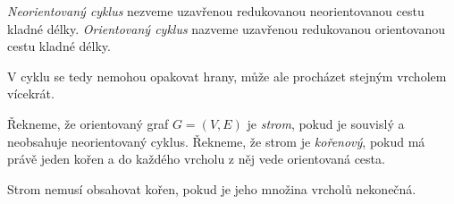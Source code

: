 \begin{definice}[Cyklus]
    \emph{Neorientovaný cyklus} nezveme uzavřenou redukovanou neorientovanou cestu kladné délky.
    \emph{Orientovaný cyklus} nazveme uzavřenou redukovanou orientovanou cestu kladné délky.
\end{definice}
V cyklu se tedy nemohou opakovat  hrany, může ale procházet stejným vrcholem vícekrát.

\begin{definice}[Strom]
    Řekneme, že orientovaný graf $G=(V,E)$ je \emph{strom}, pokud je souvislý a neobsahuje neorientovaný cyklus. Řekneme, že strom je \emph{kořenový}, pokud má právě jeden kořen a do každého vrcholu z něj vede orientovaná cesta. 
\end{definice}
\begin{pozn}
    Strom nemusí obsahovat kořen, pokud je jeho množina vrcholů nekonečná. 
\end{pozn}

